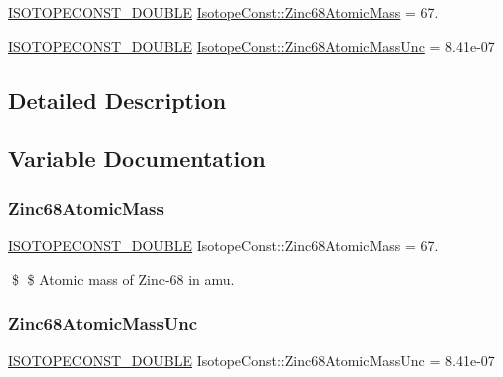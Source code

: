 \begin{DoxyCompactItemize}
\item 
\mbox{\hyperlink{group___isotope_const-_macros_ga8f45a7272ce02c0b4c65c44636ed719a}{I\+S\+O\+T\+O\+P\+E\+C\+O\+N\+S\+T\+\_\+\+D\+O\+U\+B\+LE}} \mbox{\hyperlink{group___isotope_const-_zinc-_zn68_ga079845d6822e7fed25262f3b720a3cb4}{Isotope\+Const\+::\+Zinc68\+Atomic\+Mass}} = 67.
\item 
\mbox{\hyperlink{group___isotope_const-_macros_ga8f45a7272ce02c0b4c65c44636ed719a}{I\+S\+O\+T\+O\+P\+E\+C\+O\+N\+S\+T\+\_\+\+D\+O\+U\+B\+LE}} \mbox{\hyperlink{group___isotope_const-_zinc-_zn68_ga160126b8a526bcf6cf8785217ba6244c}{Isotope\+Const\+::\+Zinc68\+Atomic\+Mass\+Unc}} = 8.\+41e-\/07
\end{DoxyCompactItemize}


\subsection{Detailed Description}


\subsection{Variable Documentation}
\mbox{\label{group___isotope_const-_zinc-_zn68_ga079845d6822e7fed25262f3b720a3cb4}} 
\subsubsection{\texorpdfstring{Zinc68\+Atomic\+Mass}{Zinc68AtomicMass}}
{\footnotesize\ttfamily \mbox{\hyperlink{group___isotope_const-_macros_ga8f45a7272ce02c0b4c65c44636ed719a}{I\+S\+O\+T\+O\+P\+E\+C\+O\+N\+S\+T\+\_\+\+D\+O\+U\+B\+LE}} Isotope\+Const\+::\+Zinc68\+Atomic\+Mass = 67.}

\$ \$ Atomic mass of Zinc-\/68 in amu. \mbox{\label{group___isotope_const-_zinc-_zn68_ga160126b8a526bcf6cf8785217ba6244c}} 
\subsubsection{\texorpdfstring{Zinc68\+Atomic\+Mass\+Unc}{Zinc68AtomicMassUnc}}
{\footnotesize\ttfamily \mbox{\hyperlink{group___isotope_const-_macros_ga8f45a7272ce02c0b4c65c44636ed719a}{I\+S\+O\+T\+O\+P\+E\+C\+O\+N\+S\+T\+\_\+\+D\+O\+U\+B\+LE}} Isotope\+Const\+::\+Zinc68\+Atomic\+Mass\+Unc = 8.\+41e-\/07}

